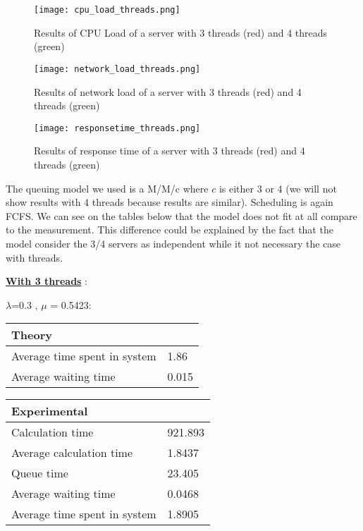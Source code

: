 \begin{figure}[!ht]
    \centering
    \texttt{[image: cpu\_load\_threads.png]}
    \caption{Results of CPU Load of a server with 3 threads (red) and 4 threads (green)}
    \label{fig:cpuload_threads}
\end{figure}

\begin{figure}[!ht]
    \centering
    \texttt{[image: network\_load\_threads.png]}
    \caption{Results of network load of a server with 3 threads (red) and 4 threads (green)}
    \label{fig:network_threads}
\end{figure}

\begin{figure}[!ht]
    \centering
    \texttt{[image: responsetime\_threads.png]}
    \caption{Results of response time of a server with 3 threads (red) and 4 threads (green)}
    \label{fig:responsetime_threads}
\end{figure}

The queuing model we used is a M/M/c where $c$ is either 3 or 4 (we will not show results with 4 threads because results are similar). Scheduling is again FCFS. We can see on the tables below that the model does not fit at all compare to the measurement. This difference could be explained by the fact that the model consider the 3/4 servers as independent while it not necessary the case with threads.

\underline{\textbf{With 3 threads}} :

\begin{minipage}{\linewidth}
   $\lambda$=0.3 , $\mu$ = 0.5423:

    \bigskip
    \begin{minipage}{0.45\linewidth}
        \begin{tabular}{|l|l|}
            \hline
            Theory & \\
            \hline
            Average time spent in system & 1.86 \\
            Average waiting time & 0.015 \\
            \hline
        \end{tabular}
    \end{minipage}
    \begin{minipage}{0.45\linewidth}
        \begin{tabular}{|l|l|}
            \hline
            Experimental & \\
            \hline
            Calculation time & 921.893 \\
            Average calculation time & 1.8437 \\
            Queue time & 23.405 \\
            Average waiting time & 0.0468  \\
            Average time spent in system & 1.8905 \\
            \hline
        \end{tabular}
    \end{minipage}
    \bigskip
\end{minipage}


